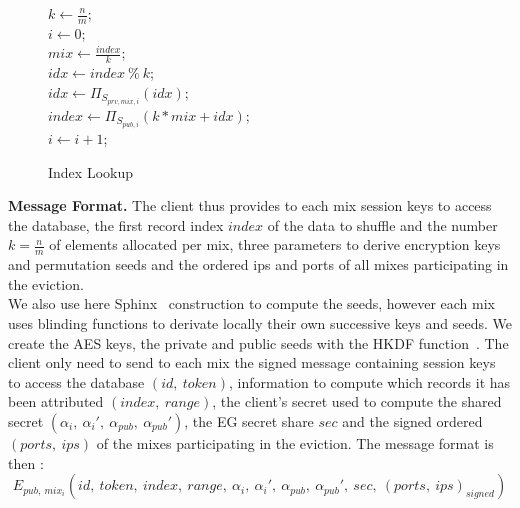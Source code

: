 \documentclass{llncs}
\begin{document}
\begin{figure}
\centering
\begin{minipage}{0.5\textwidth}
\begin{algorithm}[H]
\DontPrintSemicolon
{}
$k \gets \frac{n}{m}$;\\
$i \gets 0$;\\
{
	$mix \gets \frac{index}{k} $;\\
	$idx \gets index\ \%\ k$;\\
	$idx \gets {\Pi}_{S_{prv, mix, i}}(idx) $;\\
	$index \gets {\Pi}_{S_{pub, i}}(k*mix+idx)$;\\
	$i\gets i+1$;
}
\caption{Index Lookup}
\label{alg:IAS}
\end{algorithm}
\end{minipage}
\end{figure}

\noindent\textbf{Message Format.}
The client thus provides to each mix session keys to access the database, the first record index $index$ of the data to shuffle and the number $k=\frac{n}{m}$ of elements allocated per mix, three parameters to derive encryption keys and permutation seeds and the ordered ips and ports of all mixes participating in the eviction.\\
We also use here Sphinx~\cite{danezis2009sphinx} construction to compute the seeds, however each mix uses blinding functions to derivate locally their own successive keys and seeds. 
We create the AES keys, the private and public seeds with the HKDF function~\cite{krawczyk2010cryptographic}. The client only need to send to each mix the signed message containing session keys to access the database $(id,\ token)$, information to compute which records it has been attributed $(index,\ range)$, the client's secret used to compute the shared secret $(\alpha_i,\ \alpha_i',\ \alpha_{pub},\ \alpha_{pub}')$, the EG secret share $sec$ and the signed ordered $(ports,\ ips)$ of the mixes participating in the eviction.
The message format is then : $$E_{pub,\ mix_i}\left (id,\ token,\ index,\ range,\ \alpha_i,\ \alpha_i',\ \alpha_{pub},\ \alpha_{pub}',\ sec,\ (ports,\ ips)_{signed}\right )$$
\end{document}
